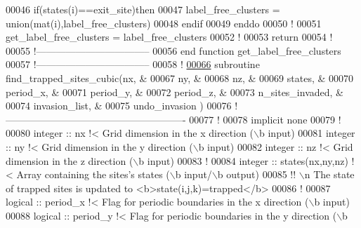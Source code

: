 \begin{DoxyCode}
00046        \textcolor{keyword}{if}(states(i)==exit\_site)\textcolor{keyword}{then}
00047           label\_free\_clusters = union(mat(i),label\_free\_clusters)
00048        \textcolor{keyword}{endif}
00049     \textcolor{keyword}{enddo}
00050     \textcolor{comment}{!}
00051     get\_label\_free\_clusters = label\_free\_clusters
00052     \textcolor{comment}{!}
00053     return
00054     \textcolor{comment}{!}
00055   \textcolor{comment}{!-----------------------------------}
00056 \textcolor{keyword}{  end function get\_label\_free\_clusters}
00057   \textcolor{comment}{!-----------------------------------}
00058   \textcolor{comment}{!}
\hypertarget{module__trapping_8f90_source_l00066}{}\hyperlink{classmodule__trapping_a15f5caceb776482e66d04fad11d9b5b1}{00066}   \textcolor{keyword}{subroutine }find\_trapped\_sites\_cubic(nx,                &
00067                                       ny,                &
00068                                       nz,                &
00069                                       states,            &
00070                                       period\_x,          &
00071                                       period\_y,          &
00072                                       period\_z,          &
00073                                       n\_sites\_invaded,   &
00074                                       invasion\_list,     &
00075                                       undo\_invasion      )
00076   \textcolor{comment}{!-------------------------------------------------------}
00077     \textcolor{comment}{!}
00078     \textcolor{keyword}{implicit none}
00079     \textcolor{comment}{!}
00080     \textcolor{keywordtype}{integer} :: nx \textcolor{comment}{!< Grid dimension in the x direction (\(\backslash\)b input)}
00081     \textcolor{keywordtype}{integer} :: ny \textcolor{comment}{!< Grid dimension in the y direction (\(\backslash\)b input)}
00082     \textcolor{keywordtype}{integer} :: nz \textcolor{comment}{!< Grid dimension in the z direction (\(\backslash\)b input)}
00083     \textcolor{comment}{!}
00084     \textcolor{keywordtype}{integer} :: states(nx,ny,nz) \textcolor{comment}{!< Array containing the sites's states (\(\backslash\)b
       input/\(\backslash\)b output)}
00085     \textcolor{comment}{!! \(\backslash\)n The state of trapped sites is updated to <b>state(i,j,k)=trapped</b>}
00086     \textcolor{comment}{!}
00087     \textcolor{keywordtype}{logical} :: period\_x \textcolor{comment}{!< Flag for periodic boundaries in the x direction (\(\backslash\)b
       input)}
00088     \textcolor{keywordtype}{logical} :: period\_y \textcolor{comment}{!< Flag for periodic boundaries in the y direction (\(\backslash\)b
}
\end{DoxyCode}
